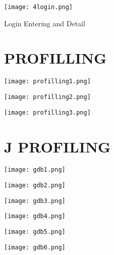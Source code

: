 \documentclass[12pt]{article}
\begin{document}
\begin{figure}
    \centering
    \texttt{[image: 4login.png]}
    \caption{Login Entering and Detail}
\end{figure}
\pagebreak

\begin{figure}
\section*{\center PROFILLING}
	\centering
    \texttt{[image: profilling1.png]}
    \caption{}
    
\end{figure}

\begin{figure}
    \centering
    \texttt{[image: profilling2.png]}
    \caption{}
\end{figure}

\begin{figure}
    \centering
    \texttt{[image: profilling3.png]}
    \caption{}
\end{figure}
\pagebreak

\begin{figure}
\section*{\center J PROFILING}
	\centering
    \texttt{[image: gdb1.png]}
    \caption{}
    
\end{figure}

\begin{figure}
    \centering
    \texttt{[image: gdb2.png]}
    \caption{}
\end{figure}

\begin{figure}
    \centering
    \texttt{[image: gdb3.png]}
    \caption{}
\end{figure}

\begin{figure}
    \centering
    \texttt{[image: gdb4.png]}
    \caption{}
\end{figure}

\begin{figure}
    \centering
    \texttt{[image: gdb5.png]}
    \caption{}
\end{figure}

\begin{figure}
    \centering
    \texttt{[image: gdb6.png]}
    \caption{}
\end{figure}
\end{document}
